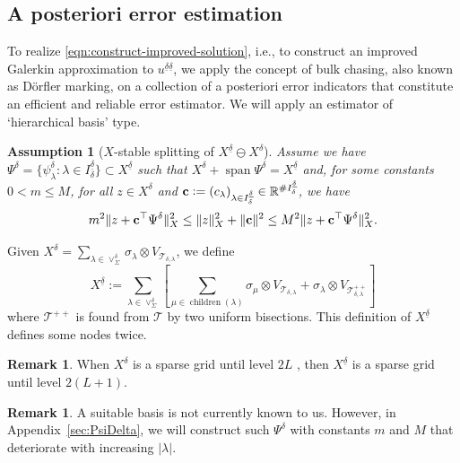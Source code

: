 \documentclass[11pt,a4paper,oneside,english]{amsart}
\numberwithin{equation}{section}
\numberwithin{theorem}{section}
\newtheorem{assum}[theorem]{Assumption}
\theoremstyle{definition}
\newtheorem{remark}[theorem]{Remark}
\newcommand{\R}{\mathbb{R}}
\DeclareMathOperator{\children}{children}
\DeclareMathOperator{\spann}{span}
\newcommand{\T}{\mathcal{T}}
\newcommand{\udelta}{{\underline{\delta}}}
\newcommand{\jw}[1]{{\color{red}{JW: #1}}}
\begin{document}
\subsection{A posteriori error estimation}
To realize \eqref{eqn:construct-improved-solution}, i.e., to construct an improved
Galerkin approximation to $u^{\udelta \udelta}$, we apply the concept of bulk
chasing, also known as D\"{o}rfler marking, on a collection of a posteriori error
indicators that constitute an efficient and reliable error estimator. We will apply
an estimator of `hierarchical basis' type.

\begin{assum}[$X$-stable splitting of $X^{\udelta} \ominus X^\delta$]
  \jw{is dit een juiste naam voor deze assumption?}
  Assume we have $\Psi^\delta=\{\psi^\delta_\lambda\colon \lambda \in I_\delta^\udelta\} \subset X^\udelta$
  such that $X^\delta + \spann \Psi^\delta=X^\udelta$ and, for some constants $0<m\leq M$,
  for all $z \in X^\delta$ and ${\bf c} := (c_\lambda)_{\lambda \in I_\delta^\udelta} \in \R^{\# I_\delta^\udelta}$, we have
  \begin{equation}
    m^2 \|z+{\bf c}^\top \Psi^\delta\|_X^2
    \leq \|z\|_X^2+\|{\bf c}\|^2
    \leq M^2 \|z+{\bf c}^\top \Psi^\delta\|_X^2.
  \label{eqn:X-stable-splitting}
  \end{equation}
  \label{assum:X-stable-splitting}
\end{assum}
Given $X^\delta = \sum_{\lambda \in \vee_\Sigma^\delta} \sigma_\lambda \otimes V_{\T_{\delta, \lambda}}$, we define
\begin{equation}
  \label{eqn:X-udelta}
  X^\udelta := \sum_{\lambda \in \vee_\Sigma^\delta} \left[\sum_{\mu \in \children(\lambda)} \sigma_\mu \otimes V_{\T_{\delta, \lambda}} +  \sigma_\lambda \otimes V_{\T^{++}_{\delta, \lambda}} \right]
\end{equation}
where $\T^{++}$ is found from $\T$ by two uniform bisections. This definition of $X^\udelta$ defines some nodes twice.\jw{slechte zin maar die "+" maar het dus niet-uniek; sommige nodes komen van "een pijltje omhoog" en "een pijltje naar rechts"}
\begin{remark}
  When $X^\delta$ is a sparse grid until level $2L$ \jw{de definitie hiervan wordt pas in \S 6 gegeven}, then $X^\udelta$ is a sparse grid until level $2(L+1)$.
\end{remark}
\begin{remark}
  A suitable basis is not currently known to us. However, in Appendix~\ref{sec:PsiDelta}, we will construct
  such $\Psi^\delta$ with constants $m$ and $M$ that deteriorate with increasing $|\lambda|$.
  \jw{is die constructie iets dat we misschien in een appendix willen zetten?}
\end{remark}
\end{document}
